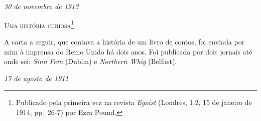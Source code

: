 \chapter*{\ }

{\raggedright
\textit{30 de novembro de 1913}\\\medskip
\par}

{\centering\large
\textsc{Uma história curiosa}\footnote{ Publicado pela primeira vez na revista \textit{Egoist}
(Londres, 1.2, 15 de janeiro de 1914, pp.~26-7) por Ezra Pound.}
\par}

\medskip

A carta a seguir, que contava a história de um livro de contos, foi enviada por
mim à imprensa do Reino Unido há dois anos. Foi publicada por dois jornais até
onde sei: \textit{Sinn Fein} (Dublin) e \textit{Northern Whig} (Belfast).

\bigskip

{\raggedright
\textit{17 de agosto de 1911}\\\smallskip
\par}

